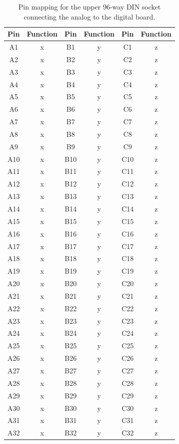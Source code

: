 \documentclass[a4paper]{article}
\begin{document}
\begin{table}[h]
    \begin{center}
        \caption{Pin mapping for the upper 96-way DIN socket connecting the analog to the digital board.}
        \label{tab:DIN96Lower}
        \begin{tabular}{cc|cc|cc}
            \hline
            \hline
            Pin & Function & Pin & Function & Pin & Function \\
            \hline
            A1 & x & B1 & y & C1 & z \\
            A2 & x & B2 & y & C2 & z \\
            A3 & x & B3 & y & C3 & z \\
            A4 & x & B4 & y & C4 & z \\
            A5 & x & B5 & y & C5 & z \\
            A6 & x & B6 & y & C6 & z \\
            A7 & x & B7 & y & C7 & z \\
            A8 & x & B8 & y & C8 & z \\
            A9 & x & B9 & y & C9 & z \\
            A10 & x & B10 & y & C10 & z \\
            A11 & x & B11 & y & C11 & z \\
            A12 & x & B12 & y & C12 & z \\
            A13 & x & B13 & y & C13 & z \\
            A14 & x & B14 & y & C14 & z \\
            A15 & x & B15 & y & C15 & z \\
            A16 & x & B16 & y & C16 & z \\
            A17 & x & B17 & y & C17 & z \\
            A18 & x & B18 & y & C18 & z \\
            A19 & x & B19 & y & C19 & z \\
            A20 & x & B20 & y & C20 & z \\
            A21 & x & B21 & y & C21 & z \\
            A22 & x & B22 & y & C22 & z \\
            A23 & x & B23 & y & C23 & z \\
            A24 & x & B24 & y & C24 & z \\
            A25 & x & B25 & y & C25 & z \\
            A26 & x & B26 & y & C26 & z \\
            A27 & x & B27 & y & C27 & z \\
            A28 & x & B28 & y & C28 & z \\
            A29 & x & B29 & y & C29 & z \\
            A30 & x & B30 & y & C30 & z \\
            A31 & x & B31 & y & C31 & z \\
            A32 & x & B32 & y & C32 & z \\
            \hline
            \hline
        \end{tabular}
    \end{center}
\end{table}
\end{document}
